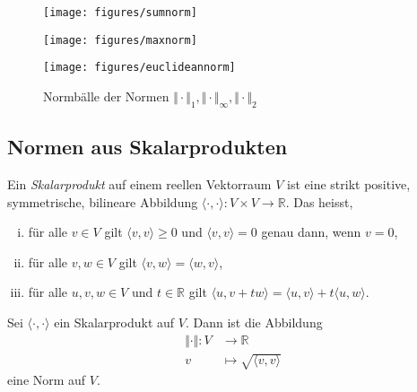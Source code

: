 \documentclass[../main.tex]{subfiles}
\begin{document}
\begin{figure}[htb]
  \centering
  \begin{minipage}{0.33\textwidth}
    \centering
    \texttt{[image: figures/sumnorm]}
  \end{minipage}%
  \begin{minipage}{0.33\textwidth}
    \centering
    \texttt{[image: figures/maxnorm]}
  \end{minipage}%
  \begin{minipage}{0.33\textwidth}
    \centering
    \texttt{[image: figures/euclideannorm]}
  \end{minipage}%
  \caption{Normbälle der Normen
  $\Vert \cdot \Vert_1,
 \Vert \cdot \Vert_{\infty},
 \Vert \cdot \Vert_2$}%
  \label{fig:norms}
\end{figure}

\subsection*{Normen aus Skalarprodukten}
\begin{definition}
  Ein \emph{Skalarprodukt} auf einem reellen Vektorraum $V$
  ist eine strikt positive, symmetrische, bilineare Abbildung
  $\langle \cdot, \cdot \rangle \colon V \times V \to \mathbb{R}$.
  Das heisst,
  \begin{enumerate}[(i)]
    \item für alle $v \in V$ gilt $\langle v, v \rangle \geq 0$
      und $\langle v, v \rangle = 0$ genau dann,
      wenn $v = 0$,
    \item für alle $v, w \in V$ gilt
      $\langle v, w \rangle = \langle w, v \rangle$,
    \item für alle $u, v, w \in V$ und $t \in \mathbb{R}$ gilt
      $\langle u, v + tw \rangle = \langle u, v \rangle + t
      \langle u, w \rangle$.
  \end{enumerate}
\end{definition}

\begin{lemma*}
  Sei $\langle \cdot, \cdot \rangle$ ein Skalarprodukt auf $V$.
  Dann ist die Abbildung
  \begin{align*}
    \Vert \cdot \Vert \colon V & \to \mathbb{R} \\
    v & \mapsto \sqrt{\langle v, v \rangle}
  \end{align*}
  eine Norm auf $V$.
\end{lemma*}
\end{document}
